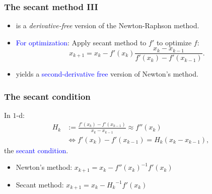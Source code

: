\documentclass[aspectratio=149]{beamer}
\begin{document}
\begin{frame}
  \frametitle{The secant method III}
  \begin{itemize}
    \item is a \emph{derivative-free} version of the Newton-Raphson method.
    \item \textcolor{blue}{For optimization}: Apply secant method to $f'$ to optimize $f$:
          \begin{equation}
            x_{k+1} = x_k - f'(x_k) \frac{x_k - x_{k-1}}{f'(x_k) - f'(x_{k-1})}.
          \end{equation}
    \item yields a \textcolor{blue}{second-derivative free} version of Newton's method.
  \end{itemize}

  \vspace{1cm}

\end{frame}


\begin{frame}
  \frametitle{The secant condition}
  In $1$-d:
  \begin{align}
    H_k &:= \frac{f'(x_k) - f'(x_{k-1})}{x_k - x_{k-1}} \approx f''(x_k) \\
    &\Leftrightarrow f'(x_k) - f'(x_{k-1}) = H_k (x_k - x_{k-1}),
  \end{align}
  the \textcolor{blue}{secant condition}.
  \begin{itemize}
    \item Newton's method: $x_{k+1} = x_k - {f''(x_k)}^{-1} f'(x_k)$
    \item Secant method: $x_{k+1} = x_k - {H_k}^{-1} f'(x_k)$
  \end{itemize}
\end{frame}
\end{document}
